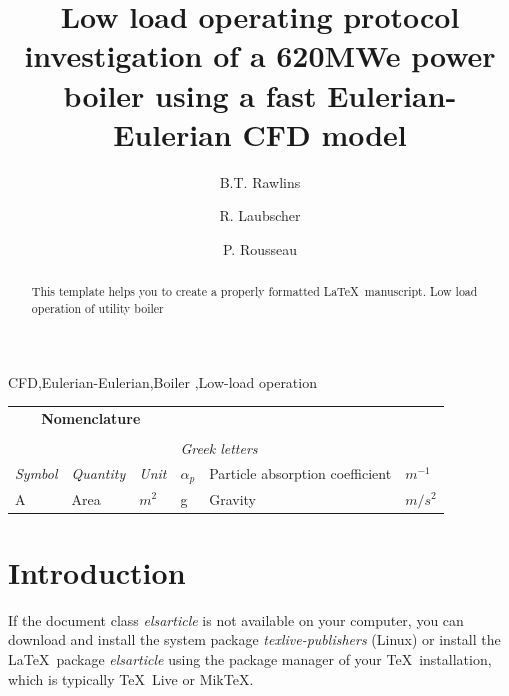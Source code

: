 \documentclass[review]{elsarticle}
\begin{document}
\begin{frontmatter}

\title{Low load operating protocol investigation of a 620MWe power boiler using a fast Eulerian-Eulerian CFD model}

\author{B.T. Rawlins}
\author{R. Laubscher}
\author{P. Rousseau}
\address{Department of Mechanical Engineering, Applied Thermal-Fluid Process Modeling Research Unit, University of Cape Town, Library Rd, Rondebosch, Cape Town, 7701, South Africa}


\begin{abstract}

This template helps you to create a properly formatted \LaTeX\ manuscript.
Low load operation of utility boiler

\end{abstract}

\begin{keyword}
CFD\sep Eulerian-Eulerian\sep Boiler \sep Low-load operation
\end{keyword}

\end{frontmatter}

\linenumbers

\begin{center}
\begin{tabular}{|p{}p{}p{}p{}p{}p{}|} 
 \hline
\multicolumn{3}{|c}{\textbf{Nomenclature}} & &  &\\
& & & & & \\
& &  & \multicolumn{3}{l|}{\textit{Greek letters}}\\
\textit{Symbol} & \textit{Quantity} & \textit{Unit} & $\alpha_p$ & Particle absorption coefficient &$m^{-1}$\\
A &  Area & $m^2$ & g & Gravity  & $m/s^2$\\
 \hline
\end{tabular}
\end{center}

\section{Introduction}

If the document class \emph{elsarticle} is not available on your computer, you can download and install the system package \emph{texlive-publishers} (Linux) or install the \LaTeX\ package \emph{elsarticle} using the package manager of your \TeX\ installation, which is typically \TeX\ Live or Mik\TeX.
\end{document}

